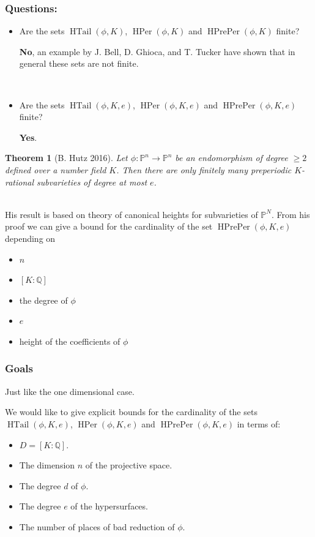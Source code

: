 \documentclass{beamer}
\def\jump{ \quad \\ \vspace{0.7cm} \pause}
\def\PP{{\mathbb P}}
\def\QQ{{\mathbb Q}}
\DeclareMathOperator{\HTail}{HTail}
\DeclareMathOperator{\HPer}{HPer}
\DeclareMathOperator{\HPrePer}{HPrePer}
\theoremstyle{thmstyle}
\theoremstyle{thmstyle}
\newtheorem*{mythm}{Theorem}
\theoremstyle{mystyle}
\theoremstyle{qstnstyle}
\begin{document}
\begin{frame}
\frametitle{Questions:}
\begin{itemize}
\item Are the sets $\HTail(\phi,K)$, $\HPer(\phi,K)$ and $\HPrePer(\phi,K)$ finite? 
\jump

\textbf{No}, an example by J. Bell, D. Ghioca, and T. Tucker have shown that in general these sets are not finite. 

\jump

\item Are the sets  $\HTail(\phi,K,e)$, $\HPer(\phi,K,e)$ and $\HPrePer(\phi,K,e)$ finite?

\pause \textbf{Yes}.


\end{itemize}

\end{frame}

\begin{frame}


\begin{mythm}[B. Hutz 2016]
Let $\phi : \PP^n \to \PP^n$ be an endomorphism of degree $\geq{2}$ defined over a number field $K$. Then there are only finitely many preperiodic $K$-rational subvarieties of degree at most $e$.
\end{mythm}

\jump 
His result is based on theory of canonical heights for subvarieties of $\PP^N$. From his proof we can give a bound for the cardinality of the set $\HPrePer(\phi,K,e)$ depending on
\begin{itemize}
\item $n$
\item $[K:\QQ]$
\item the degree of $\phi$
\item $e$
\item height of the coefficients of $\phi$
\end{itemize}
\end{frame}

\begin{frame}
\frametitle{Goals}
Just like the one dimensional case. 

We would like to give explicit bounds for the cardinality of the sets $\HTail(\phi,K,e)$, $\HPer(\phi,K,e)$ and $\HPrePer(\phi,K,e)$ in terms of:\pause
\begin{itemize}
\item  $D=[K: \QQ]$. 

\item The dimension $n$ of the projective space.  

\item The degree $d$ of $\phi$.

\item The degree $e$ of the hypersurfaces. \pause

\item  The number of places of bad reduction of $\phi$.
\end{itemize}


\end{frame}
\end{document}
